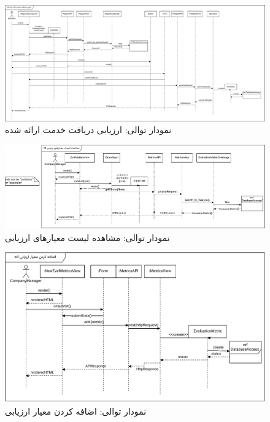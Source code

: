 \eject \pdfpagewidth=17in \pdfpageheight=8in


\begin{figure}[ht!]
	\centering
	\includegraphics[scale=0.8]{figs/design-sequence/3-25.pdf}
	\caption{نمودار توالی: ارزیابی دریافت خدمت ارائه شده}
\end{figure}
\FloatBarrier
\newpage

\eject \pdfpagewidth=13in \pdfpageheight=6in


\begin{figure}[ht!]
	\centering
	\includegraphics[scale=0.8]{figs/design-sequence/3-26.pdf}
	\caption{نمودار توالی: مشاهده لیست معیارهای ارزیابی}
\end{figure}
\FloatBarrier
\newpage

\eject \pdfpagewidth=10in \pdfpageheight=8in

\begin{figure}[ht!]
	\centering
	\includegraphics[scale=0.8]{figs/design-sequence/3-27.pdf}
	\caption{نمودار توالی: اضافه کردن معیار ارزیابی}
\end{figure}
\FloatBarrier
\newpage

